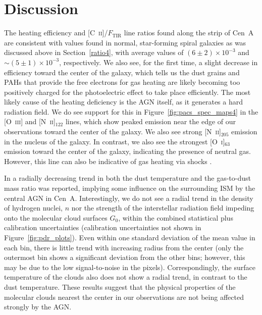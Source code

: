 \section{Discussion}\label{discussion}
The heating efficiency and [C~\textsc{ii}]/$F_{\mathrm{TIR}}$ line ratios found along the strip of Cen~A are consistent with values found in normal, star-forming spiral galaxies as was discussed above in Section~\ref{ratio4}, with average values of $(6 \pm 2) \times 10^{-3}$ and $\sim (5 \pm 1) \times 10^{-3}$, respectively.  We also see, for the first time, a slight decrease in efficiency toward the center of the galaxy, which tells us the dust grains and PAHs that provide the free electrons for gas heating are likely becoming too positively charged for the photoelectric effect to take place efficiently.  The most likely cause of the heating deficiency is the AGN itself, as it generates a hard radiation field.  We do see support for this in Figure~\ref{fig:pacs_spec_maps4} in the [O~\textsc{iii}] and [N~\textsc{ii}]$_{122}$ lines, which show peaked emission near the edge of our observations toward the center of the galaxy.  We also see strong [N~\textsc{ii}]$_{205}$ emission in the nucleus of the galaxy.  In contrast, we also see the strongest [O~\textsc{i}]$_{63}$ emission toward the center of the galaxy, indicating the presence of neutral gas.  However, this line can also be indicative of gas heating via shocks \citep{1989ApJ...342..306H}.

In \citet{2012MNRAS.422.2291P} a radially decreasing trend in both the dust temperature and the gas-to-dust mass ratio was reported, implying some influence on the surrounding ISM by the central AGN in Cen~A.  Interestingly, we do not see a radial trend in the density of hydrogen nuclei, $n$ nor the strength of the interstellar radiation field impeding onto the molecular cloud surfaces $G_{0}$, within the combined statistical plus calibration uncertainties (calibration uncertainties not shown in Figure~\ref{fig:pdr_plots}).  Even within one standard deviation of the mean value in each bin, there is little trend with increasing radius from the center (only the outermost bin shows a significant deviation from the other bins; however, this may be due to the low signal-to-noise in the pixels).  Correspondingly, the surface temperature of the clouds also does not show a radial trend, in contrast to the dust temperature.  These results suggest that the physical properties of the molecular clouds nearest the center in our observations are not being affected strongly by the AGN.


